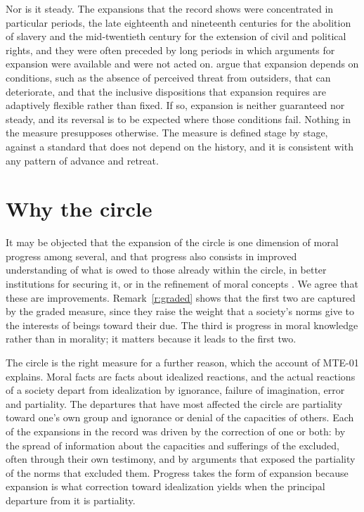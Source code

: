 \documentclass{situationist-preprint}
\begin{document}
Nor is it steady. The expansions that the record shows were concentrated in particular periods, the late eighteenth and nineteenth centuries for the abolition of slavery and the mid-twentieth century for the extension of civil and political rights, and they were often preceded by long periods in which arguments for expansion were available and were not acted on. \citet{BuchananPowell2018} argue that expansion depends on conditions, such as the absence of perceived threat from outsiders, that can deteriorate, and that the inclusive dispositions that expansion requires are adaptively flexible rather than fixed. If so, expansion is neither guaranteed nor steady, and its reversal is to be expected where those conditions fail. Nothing in the measure presupposes otherwise. The measure is defined stage by stage, against a standard that does not depend on the history, and it is consistent with any pattern of advance and retreat.

\section{Why the circle}

It may be objected that the expansion of the circle is one dimension of moral progress among several, and that progress also consists in improved understanding of what is owed to those already within the circle, in better institutions for securing it, or in the refinement of moral concepts \citep{MoodyAdams1999}. We agree that these are improvements. Remark~\ref{r:graded} shows that the first two are captured by the graded measure, since they raise the weight that a society's norms give to the interests of beings toward their due. The third is progress in moral knowledge rather than in morality; it matters because it leads to the first two.

The circle is the right measure for a further reason, which the account of MTE-01 explains. Moral facts are facts about idealized reactions, and the actual reactions of a society depart from idealization by ignorance, failure of imagination, error and partiality. The departures that have most affected the circle are partiality toward one's own group and ignorance or denial of the capacities of others. Each of the expansions in the record was driven by the correction of one or both: by the spread of information about the capacities and sufferings of the excluded, often through their own testimony, and by arguments that exposed the partiality of the norms that excluded them. Progress takes the form of expansion because expansion is what correction toward idealization yields when the principal departure from it is partiality.
\end{document}
